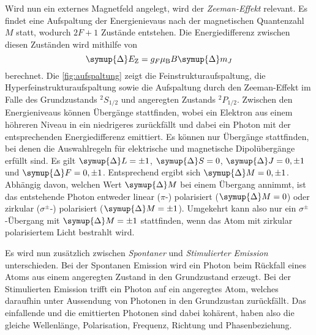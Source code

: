     Wird nun ein externes Magnetfeld angelegt,
    wird der \textit{Zeeman-Effekt} relevant.
    Es findet eine Aufspaltung der Energienievaus nach der magnetischen Quantenzahl $M$ statt,
    wodurch $2F+1$ Zustände entstehen.
    Die Energiedifferenz zwischen diesen Zuständen wird mithilfe von
    \begin{equation}
        \symup{\Delta} E_\text{Z} = g_F \mu_\text{B} B \symup{\Delta} m_J
        \label{eqn:zeemanaufspaltung}
    \end{equation}
    berechnet.
    Die \autoref{fig:aufspaltung} zeigt die Feinstrukturaufspaltung,
    die Hyperfeinstrukturaufspaltung sowie die Aufspaltung durch den Zeeman-Effekt im Falle des Grundzustands $^2S_{1/2}$ und angeregten Zustands $^2P_{1/2}$.
    Zwischen den Energieniveaus können Übergänge stattfinden,
    wobei ein Elektron aus einem höhreren Niveau in ein niedrigeres zurückfällt und dabei ein Photon mit der entsprechenden Energiedifferenz emittiert.
    Es können nur Übergänge stattfinden,
    bei denen die Auswahlregeln für elektrische und magnetische Dipolübergänge erfüllt sind.
    Es gilt $\symup{\Delta} L = \pm 1$, $\symup{\Delta} S = 0$, $\symup{\Delta} J = 0, \pm 1$ und $\symup{\Delta} F = 0, \pm 1$.
    Entsprechend ergibt sich $\symup{\Delta} M = 0, \pm 1$.
    Abhängig davon,
    welchen Wert $\symup{\Delta} M$ bei einem Übergang annimmt,
    ist das entstehende Photon entweder linear ($\pi$-) polarisiert ($\symup{\Delta}M = 0$) oder zirkular ($\sigma^{\pm}$-) polarisiert ($\symup{\Delta}M = \pm 1$).
    Umgekehrt kann also nur ein $\sigma^{\pm}$-Übergang mit $\symup{\Delta} M = \pm 1$ stattfinden,
    wenn das Atom mit zirkular polarisiertem Licht bestrahlt wird.

    Es wird nun zusätzlich zwischen \textit{Spontaner} und \textit{Stimulierter Emission} unterschieden.
    Bei der Spontanen Emission wird ein Photon beim Rückfall eines Atoms aus einem angeregten Zustand in den Grundzustand erzeugt.
    Bei der Stimulierten Emission trifft ein Photon auf ein angeregtes Atom,
    welches daraufhin unter Aussendung von Photonen in den Grundzustan zurückfällt.
    Das einfallende und die emittierten Photonen sind dabei kohärent,
    haben also die gleiche Wellenlänge, Polarisation, Frequenz, Richtung und Phasenbeziehung.


